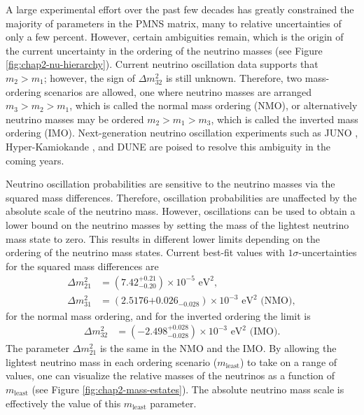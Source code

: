 A large experimental effort over the past few decades has greatly constrained the majority of parameters in the PMNS matrix, many to relative uncertainties of only a few percent. However, certain ambiguities remain, which is the origin of the current uncertainty in the ordering of the neutrino masses (see Figure \ref{fig:chap2-nu-hierarchy}). Current neutrino oscillation data supports that $m_2>m_1$; however, the sign of $\Delta m_{32}^2$ is still unknown. Therefore, two mass-ordering scenarios are allowed, one where neutrino masses are arranged $m_3>m_2>m_1$, which is called the normal mass ordering (NMO), or alternatively neutrino masses may be ordered $m_2>m_1>m_3$, which is called the inverted mass ordering (IMO). Next-generation neutrino oscillation experiments such as JUNO \cite{JUNO}, Hyper-Kamiokande \cite{hyperk}, and DUNE \cite{DUNE} are poised to resolve this ambiguity in the coming years.

Neutrino oscillation probabilities are sensitive to the neutrino masses via the squared mass differences. Therefore, oscillation probabilities are unaffected by the absolute scale of the neutrino mass. However, oscillations can be used to obtain a lower bound on the neutrino masses by setting the mass of the lightest neutrino mass state to zero. This results in different lower limits depending on the ordering of the neutrino mass states. Current best-fit values \cite{Workman:2022ynf} with $1\sigma$-uncertainties for the squared mass differences are 
\begin{align}
    \Delta m_{21}^2&=(7.42^{+0.21}_{-0.20})\times 10^{-5}\text{ eV}^2,\\
    \Delta m_{31}^2&=(2.5176{+0.026}_{-0.028})\times 10^{-3}\text{ eV}^2\text{ (NMO)},
\end{align}
for the normal mass ordering, and for the inverted ordering the limit is
\begin{align}
    \Delta m_{32}^2&=(-2.498^{+0.028}_{-0.028})\times 10^{-3}\text{ eV}^2\text{ (IMO)}.
\end{align}
The parameter $\Delta m_{21}^2$ is the same in the NMO and the IMO. By allowing the lightest neutrino mass in each ordering scenario ($m_\textrm{least}$) to take on a range of values, one can visualize the relative masses of the neutrinos as a function of $m_\textrm{least}$ (see Figure \ref{fig:chap2-mass-estates}). The absolute neutrino mass scale is effectively the value of this $m_\textrm{least}$ parameter.

